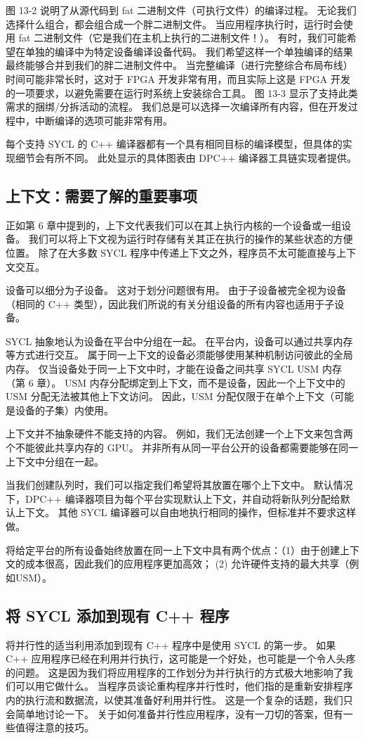 图 13-2 说明了从源代码到 fat 二进制文件（可执行文件）的编译过程。 无论我们选择什么组合，都会组合成一个胖二进制文件。 当应用程序执行时，运行时会使用 fat 二进制文件（它是我们在主机上执行的二进制文件！）。 有时，我们可能希望在单独的编译中为特定设备编译设备代码。 我们希望这样一个单独编译的结果最终能够合并到我们的胖二进制文件中。 当完整编译（进行完整综合布局布线）时间可能非常长时，这对于 FPGA 开发非常有用，而且实际上这是 FPGA 开发的一项要求，以避免需要在运行时系统上安装综合工具。 图 13-3 显示了支持此类需求的捆绑/分拆活动的流程。 我们总是可以选择一次编译所有内容，但在开发过程中，中断编译的选项可能非常有用。

每个支持 SYCL 的 C++ 编译器都有一个具有相同目标的编译模型，但具体的实现细节会有所不同。 此处显示的具体图表由 DPC++ 编译器工具链实现者提供。

\subsection{上下文：需要了解的重要事项}
正如第 6 章中提到的，上下文代表我们可以在其上执行内核的一个设备或一组设备。 我们可以将上下文视为运行时存储有关其正在执行的操作的某些状态的方便位置。 除了在大多数 SYCL 程序中传递上下文之外，程序员不太可能直接与上下文交互。

设备可以细分为子设备。 这对于划分问题很有用。 由于子设备被完全视为设备（相同的 C++ 类型），因此我们所说的有关分组设备的所有内容也适用于子设备。

SYCL 抽象地认为设备在平台中分组在一起。 在平台内，设备可以通过共享内存等方式进行交互。 属于同一上下文的设备必须能够使用某种机制访问彼此的全局内存。 仅当设备处于同一上下文中时，才能在设备之间共享 SYCL USM 内存（第 6 章）。 USM 内存分配绑定到上下文，而不是设备，因此一个上下文中的 USM 分配无法被其他上下文访问。 因此，USM 分配仅限于在单个上下文（可能是设备的子集）内使用。

上下文并不抽象硬件不能支持的内容。 例如，我们无法创建一个上下文来包含两个不能彼此共享内存的 GPU。 并非所有从同一平台公开的设备都需要能够在同一上下文中分组在一起。

当我们创建队列时，我们可以指定我们希望将其放置在哪个上下文中。 默认情况下，DPC++ 编译器项目为每个平台实现默认上下文，并自动将新队列分配给默认上下文。 其他 SYCL 编译器可以自由地执行相同的操作，但标准并不要求这样做。

将给定平台的所有设备始终放置在同一上下文中具有两个优点：（1）由于创建上下文的成本很高，因此我们的应用程序更加高效； (2) 允许硬件支持的最大共享（例如USM）。

\subsection{将 SYCL 添加到现有 C++ 程序}
将并行性的适当利用添加到现有 C++ 程序中是使用 SYCL 的第一步。 如果 C++ 应用程序已经在利用并行执行，这可能是一个好处，也可能是一个令人头疼的问题。 这是因为我们将应用程序的工作划分为并行执行的方式极大地影响了我们可以用它做什么。 当程序员谈论重构程序并行性时，他们指的是重新安排程序内的执行流和数据流，以使其准备好利用并行性。 这是一个复杂的话题，我们只会简单地讨论一下。 关于如何准备并行性应用程序，没有一刀切的答案，但有一些值得注意的技巧。

